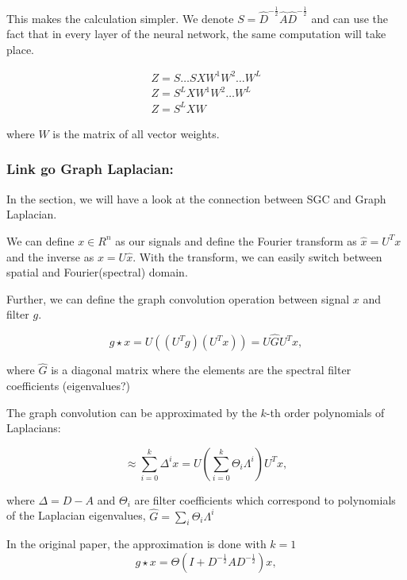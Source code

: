 This makes the calculation simpler. We denote $S = \hat{D}^{-\frac{1}{2}} \hat{A} \hat{D}^{-\frac{1}{2}} $
and can use the fact that in every layer of the neural network, the same computation will take place.

\begin{equation}
    \begin{aligned}
        Z = S \dots S X W^1 W^2 \dots W^L \\
        Z = S^L X W^1 W^2 \dots W^L \\
        Z = S^L X W    
    \end{aligned}
\end{equation}

where $W$ is the matrix of all vector weights.



\subsubsection{Link go Graph Laplacian:}

In the section, we will have a look at the connection between SGC and Graph Laplacian.

We can define $x \in R^n$ as our signals and define the Fourier transform as $\hat{x} = U^T x$
and the inverse as $x = U\hat{x}$. 
With the transform, we can easily switch between spatial and Fourier(spectral) domain.

Further, we can define the graph convolution operation between signal $x$ and filter $g$.

\begin{equation}
    g \star x = U((U^T g) (U^T x)) = U \hat{G} U^T x,
\end{equation}

where $\hat{G}$ is a diagonal matrix where the elements are the 
spectral filter coefficients (eigenvalues?)

The graph convolution can be approximated by the $k$-th order polynomials of Laplacians:

\begin{equation}
    \approx \sum_{i=0}^{k} \Delta^i x = U \left ( \sum_{i=0}^{k}  \Theta_i \Lambda^i \right ) U^T x,
\end{equation}

where $\Delta = D - A$ and $\Theta_i$ are 
filter coefficients which correspond to polynomials of the Laplacian eigenvalues,
 $\hat{G} = \sum_i \Theta_i \Lambda^i$


 In the original \cite{GCN} paper, the approximation is done with $k = 1$ 
 \begin{equation}
     g \star x = \Theta (I + D^{-\frac{1}{2}} A D^{-\frac{1}{2}} )x,
 \end{equation}

